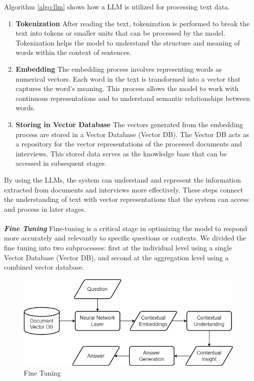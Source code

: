 \documentclass[runningheads]{llncs}
\begin{document}
Algorithm \ref{algo:llm} shows how a LLM is utilized for processing text data.

\begin{enumerate}  
    \item \textbf{Tokenization} After reading the text, tokenization is performed to break the text into tokens or smaller units that can be processed by the model. Tokenization helps the model to understand the structure and meaning of words within the context of sentences.
    
    \item \textbf{Embedding} The embedding process involves representing words as numerical vectors. Each word in the text is transformed into a vector that captures the word's meaning. This process allows the model to work with continuous representations and to understand semantic relationships between words.
    
    \item \textbf{Storing in Vector Database} The vectors generated from the embedding process are stored in a Vector Database (Vector DB). The Vector DB acts as a repository for the vector representations of the processed documents and interviews. This stored data serves as the knowledge base that can be accessed in subsequent stages.
\end{enumerate}

By using the LLMs, the system can understand and represent the information extracted from documents and interviews more effectively. These steps connect the understanding of text with vector representations that the system can access and process in later stages.\\ 
\\
\textbf{\textit{Fine Tuning}} Fine-tuning is a critical stage in optimizing the model to respond more accurately and relevantly to specific questions or contexts. We divided the fine tuning into two subprocesses: first at the individual level using a single Vector Database (Vector DB), and second at the aggregation level using a combined vector database.

\begin{figure}[htbp]
    \centerline{\includegraphics[scale=0.4]{eng-fine1.png}}
    \caption{Fine Tuning}
    \label{fig:fine-tuning-1}
\end{figure}
\end{document}
